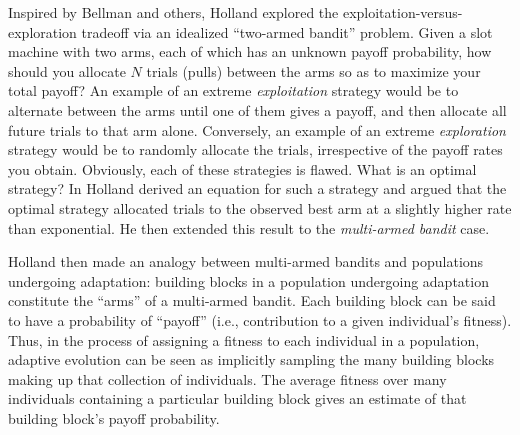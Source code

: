 
Inspired by Bellman \cite{Bellman1961} and
others, Holland explored the exploitation-versus-exploration tradeoff
via an idealized ``two-armed bandit'' problem.  Given a slot machine
with two arms, each of which has an unknown payoff probability, how
should you allocate $N$ trials (pulls) between the arms so as to
maximize your total payoff?  An example of an extreme \emph{exploitation} strategy would be to alternate between the arms until
one of them gives a payoff, and then allocate all future trials to
that arm alone.  Conversely, an example of an extreme \emph{exploration} strategy would be to randomly allocate the trials,
irrespective of the payoff rates you obtain.  Obviously, each of these
strategies is flawed.  What is an optimal strategy?
In \cite{Holland1973,Holland1975} Holland derived
an equation for such a strategy and argued that the optimal strategy
allocated trials to the observed best arm at a slightly higher rate than
exponential.  
He then extended this 
result to the \emph{multi-armed bandit} case.

Holland then made an analogy between multi-armed bandits and
populations undergoing adaptation: building blocks in a population
undergoing adaptation constitute the ``arms'' of a multi-armed bandit.
Each building block can be said to have a probability of ``payoff''
(i.e., contribution to a given individual's fitness).
Thus, in the process of assigning a fitness to each individual in a
population, adaptive evolution can be seen as implicitly sampling the
many building blocks making up that collection of individuals.  The
average fitness over many individuals containing a particular building
block gives an estimate of that building block's payoff probability.


